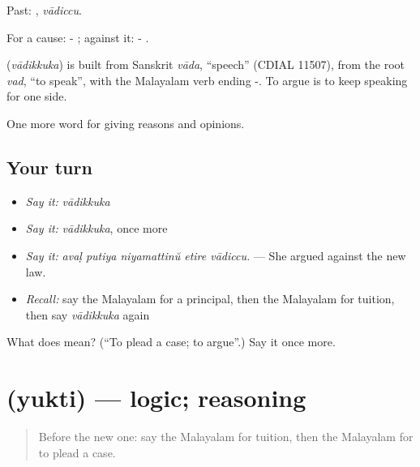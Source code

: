 Past: , \emph{vādiccu}.

For a cause: -  ; against it: -  .

\begin{cousinweb}
\textbf{} (\emph{vādikkuka}) is built from Sanskrit \emph{vāda}, \textquotedblleft{}speech\textquotedblright{} (CDIAL 11507), from the root \emph{vad}, \textquotedblleft{}to speak\textquotedblright{}, with the Malayalam verb ending -. To argue is to keep speaking for one side.
\end{cousinweb}

\begin{grammarlens}[title={What you've built}]
One more word for giving reasons and opinions.
\end{grammarlens}

\subsection*{Your turn}
\begin{itemize}
\raggedright
  \item \emph{Say it:} \emph{vādikkuka}
  \item \emph{Say it:} \emph{vādikkuka}, once more
  \item \emph{Say it:} \emph{avaḷ putiya niyamattinŭ etire vādiccu.} — She argued against the new law.
  \item \emph{Recall:} say the Malayalam for a principal, then the Malayalam for tuition, then say \emph{vādikkuka} again
\end{itemize}

\begin{tcolorbox}[breakable,colback=teal!4,colframe=teal!35!black,title={Before you move on}]
What does  mean? (\textquotedblleft{}To plead a case; to argue\textquotedblright{}.) Say it once more.
\end{tcolorbox}
\section[\texorpdfstring{\ml{യുക്തി} (yukti)}{യുക്തി (yukti)}]{ (yukti) — logic; reasoning}

\label{lesson:ML-C405-yukti}



\begin{quote}
Before the new one: say the Malayalam for tuition, then the Malayalam for to plead a case.
\end{quote}


